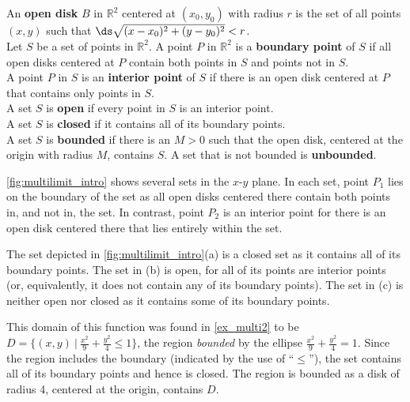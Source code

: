 \begin{definition}\label{def:open}
An \textbf{open disk} $B$ in $\mathbb{R}^2$ centered at $(x_0,y_0)$ with radius $r$ is the set of all points $(x,y)$ such that $\ds\sqrt{(x-x_0)^2+(y-y_0)^2} < r$. \\

Let $S$ be a set of points in $\mathbb{R}^2$. A point $P$ in $\mathbb{R}^2$ is a \textbf{boundary point} of $S$  if all open disks centered at $P$ contain both points in $S$ and points not in $S$.\\

A point $P$ in $S$ is an \textbf{interior point} of $S$ if there is an open disk centered at $P$ that contains only points in $S$.\\

A set $S$ is \textbf{open} if every point in $S$ is an interior point.\\

A set $S$ is \textbf{closed} if it contains all of its boundary points.\\

A set $S$ is \textbf{bounded} if there is an $M>0$ such that the open disk, centered at the origin with radius $M$, contains $S$. A set that is not bounded is \textbf{unbounded}.
\end{definition}

\autoref{fig:multilimit_intro} shows several sets in the $x$-$y$ plane. In each set, point $P_1$ lies on the boundary of the set as all open disks centered there contain both points in, and not in, the set. In contrast, point $P_2$ is an interior point for there is an open disk centered there that lies entirely within the set.

The set depicted in \autoref{fig:multilimit_intro}(a) is a closed set as it contains all of its boundary points. The set in (b) is open, for all of its points are interior points (or, equivalently, it does not contain any of its boundary points). The set in (c) is neither open nor closed as it contains  some of its boundary points.

{This domain of this function was found in \autoref{ex_multi2} to be $D = \{(x,y)\ |\ \frac{x^2}9+\frac{y^2}4\leq 1\}$, the region \textit{bounded} by the ellipse $\frac{x^2}9+\frac{y^2}4=1$. Since the region includes the boundary (indicated by the use of ``$\leq$''), the set contains all of its boundary points and hence is closed. The region is bounded as a disk of radius 4, centered at the origin, contains $D$.}

